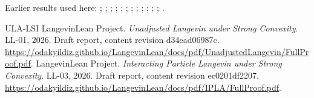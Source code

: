 \documentclass[11pt,a4paper]{article}
\begin{document}
Earlier results used here: \cite[Section~3.17.3]{LangevinLean2026ULASC}; \cite[Section~3.17.4]{LangevinLean2026ULASC}; \cite[Section~3.21.2]{LangevinLean2026ULASC}; \cite[Section~3.26.13]{LangevinLean2026ULASC}; \cite[Section~3.26.15]{LangevinLean2026ULASC}; \cite[Section~3.26.3]{LangevinLean2026ULASC}; \cite[Section~3.33.9]{LangevinLean2026ULASC}; \cite[Section~3.1.1]{LangevinLean2026IPLA}; \cite[Section~3.1.3]{LangevinLean2026IPLA}; \cite[Section~3.1.4]{LangevinLean2026IPLA}; \cite[Section~3.3.2]{LangevinLean2026IPLA}; \cite[Section~3.5.1]{LangevinLean2026IPLA}; \cite[Section~3.7.1]{LangevinLean2026IPLA}.

\begin{thebibliography}{ULA-LSI}
LangevinLean Project. \emph{Unadjusted Langevin under Strong Convexity}. LL-01, 2026. Draft report, content revision d34ead06987c. \url{https://odakyildiz.github.io/LangevinLean/docs/pdf/UnadjustedLangevin/FullProof.pdf}.
LangevinLean Project. \emph{Interacting Particle Langevin under Strong Convexity}. LL-03, 2026. Draft report, content revision ec0201df2207. \url{https://odakyildiz.github.io/LangevinLean/docs/pdf/IPLA/FullProof.pdf}.
\end{thebibliography}
\end{document}
